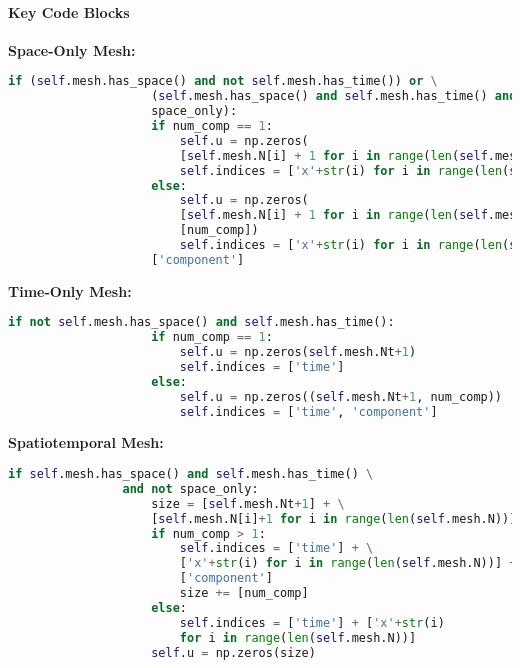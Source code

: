 \documentclass{article}
\begin{document}
\begin{comment}
					\end{itemize}
				\end{itemize}
				\item \textbf{Set Indices:}
				\begin{itemize}
					\item \texttt{self.indices} provides a human-readable representation of the array dimensions:
					\begin{itemize}
						\item For a 2D spatial mesh: \texttt{['x0', 'x1']}.
						\item For a spatiotemporal mesh: \texttt{['time', 'x0', 'x1']}.
						\item For multi-component functions, \texttt{['component']} is appended.
					\end{itemize}
				\end{itemize}
			\end{enumerate}
				content...
			\end{comment}
			\paragraph{Key Code Blocks}
			\textbf{Space-Only Mesh:}
			\begin{lstlisting}[language=Python]
				if (self.mesh.has_space() and not self.mesh.has_time()) or \
					(self.mesh.has_space() and self.mesh.has_time() and \
					space_only):
					if num_comp == 1:
						self.u = np.zeros(
						[self.mesh.N[i] + 1 for i in range(len(self.mesh.N))])
						self.indices = ['x'+str(i) for i in range(len(self.mesh.N))]
					else:
						self.u = np.zeros(
						[self.mesh.N[i] + 1 for i in range(len(self.mesh.N))] +
						[num_comp])
						self.indices = ['x'+str(i) for i in range(len(self.mesh.N))] +\
					['component']
			\end{lstlisting}
			
			\textbf{Time-Only Mesh:}
			\begin{lstlisting}[language=Python]
				if not self.mesh.has_space() and self.mesh.has_time():
					if num_comp == 1:
						self.u = np.zeros(self.mesh.Nt+1)
						self.indices = ['time']
					else:
						self.u = np.zeros((self.mesh.Nt+1, num_comp))
						self.indices = ['time', 'component']
			\end{lstlisting}
			
			\textbf{Spatiotemporal Mesh:}
			\begin{lstlisting}[language=Python]
				if self.mesh.has_space() and self.mesh.has_time() \
				and not space_only:
					size = [self.mesh.Nt+1] + \
					[self.mesh.N[i]+1 for i in range(len(self.mesh.N))]
					if num_comp > 1:
						self.indices = ['time'] + \
						['x'+str(i) for i in range(len(self.mesh.N))] +\
						['component']
						size += [num_comp]
					else:
						self.indices = ['time'] + ['x'+str(i)
						for i in range(len(self.mesh.N))]
					self.u = np.zeros(size)
			\end{lstlisting}
			
\end{document}
